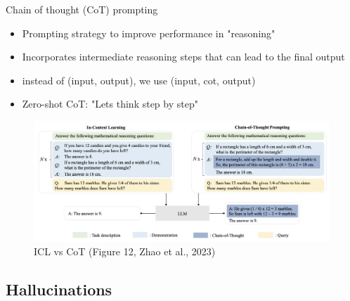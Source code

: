 \documentclass[10pt]{beamer}
\begin{document}
\begin{frame}{Chain of thought (CoT) prompting}


\begin{itemize}
\item Prompting strategy to improve performance in "reasoning"
\item Incorporates intermediate reasoning steps that can lead to the final output
\item instead of (input, output), we use (input, cot, output)
\item Zero-shot CoT: "Lets think step by step"
\end{itemize}

\begin{figure}[h]
\centering
\includegraphics[width=0.99\textwidth]{fig/zhao_2023_fig12}
\caption{ICL vs CoT (Figure 12, Zhao et al., 2023)}
\end{figure}

\end{frame}



\subsection{Hallucinations}
\end{document}
